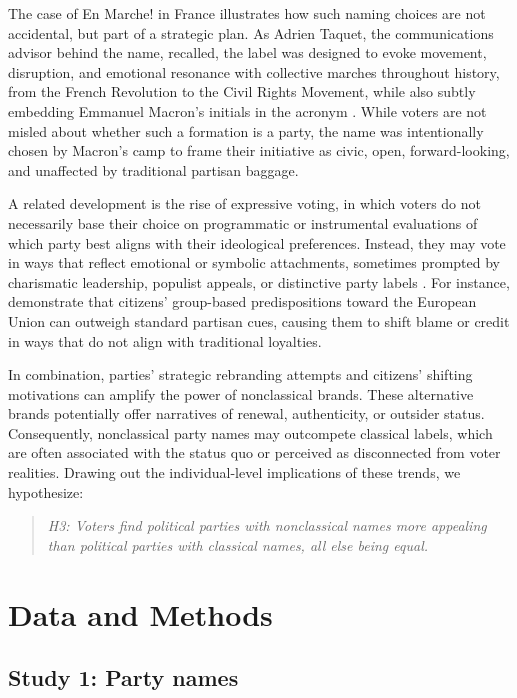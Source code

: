 \documentclass[12pt]{article}
\begin{document}
The case of En Marche! in France illustrates how such naming choices are not accidental, but part of a strategic plan. As Adrien Taquet, the communications advisor behind the name,  recalled, the label was designed to evoke movement, disruption, and emotional resonance with collective marches throughout history, from the French Revolution to the Civil Rights Movement, while also subtly embedding Emmanuel Macron’s initials in the acronym \citep{lorrain2017}. While voters are not misled about whether such a formation is a party, the name was intentionally chosen by Macron's camp to frame their initiative as civic, open, forward-looking, and unaffected by traditional partisan baggage.

A related development is the rise of expressive voting, in which voters do not necessarily base their choice on programmatic or instrumental evaluations of which party best aligns with their ideological preferences. Instead, they may vote in ways that reflect emotional or symbolic attachments, sometimes prompted by charismatic leadership, populist appeals, or distinctive party labels \citep{Brennan_Lomasky_1997, Schuessler_2000, Hamlin_Jennings_2011}. For instance, \citet[][]{Hobolt_Tilley_2014} demonstrate that citizens' group-based predispositions toward the European Union can outweigh standard partisan cues, causing them to shift blame or credit in ways that do not align with traditional loyalties.

In combination, parties' strategic rebranding attempts and citizens' shifting motivations can amplify the power of nonclassical brands. These alternative brands potentially offer narratives of renewal, authenticity, or outsider status. Consequently, nonclassical party names may outcompete classical labels, which are often associated with the status quo or perceived as disconnected from voter realities. Drawing out the individual-level implications of these trends, we hypothesize:

\begin{quote}
\textit{H3: Voters find political parties with nonclassical names more appealing than political parties with classical names, all else being equal.}
\end{quote}

\section{Data and Methods}

\subsection{Study 1: Party names}
\end{document}

